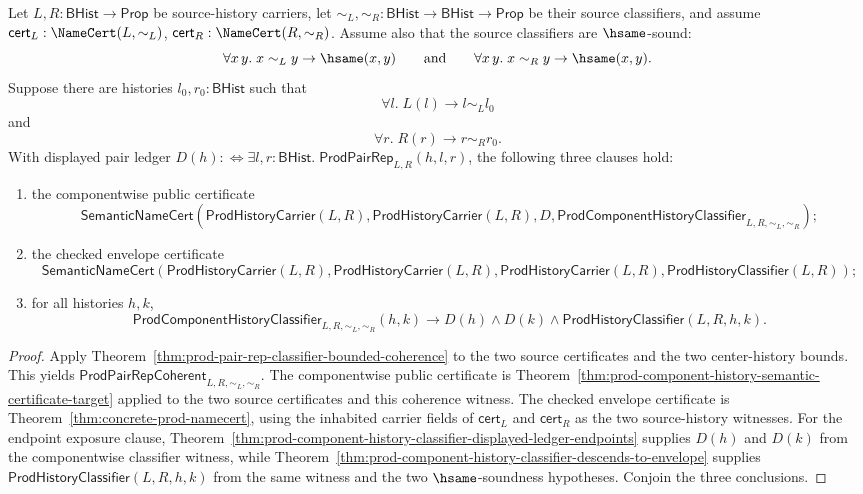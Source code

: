\begin{theorem}
\label{thm:prod-classifier-bounded-componentwise-certificate-refines-envelope}
Let $L,R:\mathsf{BHist}\to\mathsf{Prop}$ be source-history carriers, let
$\sim_L,\sim_R:\mathsf{BHist}\to\mathsf{BHist}\to\mathsf{Prop}$ be their source
classifiers, and assume $\mathsf{cert}_L:\NameCert(L,\sim_L)$,
$\mathsf{cert}_R:\NameCert(R,\sim_R)$. Assume also that the source classifiers
are $\hsame$-sound:
$$
\forall x\,y.\;x\sim_L y\to\hsame(x,y)
\qquad\hbox{and}\qquad
\forall x\,y.\;x\sim_R y\to\hsame(x,y).
$$
Suppose there are histories $l_0,r_0:\mathsf{BHist}$ such that
$$
\forall l.\;L(l)\to l\sim_L l_0
$$
and
$$
\forall r.\;R(r)\to r\sim_R r_0.
$$
With displayed pair ledger
$D(h):\Longleftrightarrow
\exists l,r:\mathsf{BHist}.\;\mathsf{ProdPairRep}_{L,R}(h,l,r)$, the following
three clauses hold:
\begin{enumerate}
  \item the componentwise public certificate
  $$
  \mathsf{SemanticNameCert}(\mathsf{ProdHistoryCarrier}(L,R),
  \mathsf{ProdHistoryCarrier}(L,R),
  D,
  \mathsf{ProdComponentHistoryClassifier}_{L,R,\sim_L,\sim_R});
  $$
  \item the checked envelope certificate
  $$
  \mathsf{SemanticNameCert}(\mathsf{ProdHistoryCarrier}(L,R),
  \mathsf{ProdHistoryCarrier}(L,R),
  \mathsf{ProdHistoryCarrier}(L,R),
  \mathsf{ProdHistoryClassifier}(L,R));
  $$
  \item for all histories $h,k$,
  $$
  \mathsf{ProdComponentHistoryClassifier}_{L,R,\sim_L,\sim_R}(h,k)
  \to
  D(h)\land D(k)\land
  \mathsf{ProdHistoryClassifier}(L,R,h,k).
  $$
\end{enumerate}
\end{theorem}
\begin{proof}
Apply Theorem~\ref{thm:prod-pair-rep-classifier-bounded-coherence} to the two
source certificates and the two center-history bounds. This yields
$\mathsf{ProdPairRepCoherent}_{L,R,\sim_L,\sim_R}$. The componentwise public
certificate is Theorem~\ref{thm:prod-component-history-semantic-certificate-target}
applied to the two source certificates and this coherence witness. The checked
envelope certificate is Theorem~\ref{thm:concrete-prod-namecert}, using the
inhabited carrier fields of $\mathsf{cert}_L$ and $\mathsf{cert}_R$ as the two
source-history witnesses. For the endpoint exposure clause,
Theorem~\ref{thm:prod-component-history-classifier-displayed-ledger-endpoints}
supplies $D(h)$ and $D(k)$ from the componentwise classifier witness, while
Theorem~\ref{thm:prod-component-history-classifier-descends-to-envelope} supplies
$\mathsf{ProdHistoryClassifier}(L,R,h,k)$ from the same witness and the two
$\hsame$-soundness hypotheses. Conjoin the three conclusions.
\end{proof}

